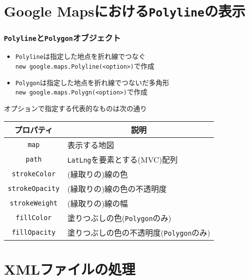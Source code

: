  \section{Google Mapsにおける\texttt{Polyline}の表示}
\begin{frame}[containsverbatim]
 \frametitle{\texttt{Polyline}と\texttt{Polygon}オブジェクト}
 \begin{itemize}
  \item \texttt{Polyline}は指定した地点を折れ線でつなぐ\\
        \texttt{new google.maps.Polyline(<option>)}で作成
  \item \texttt{Polygon}は指定した地点を折れ線でつないだ多角形\\
        \texttt{new google.maps.Polygn(<option>)}で作成
 \end{itemize}
 オプションで指定する代表的なものは次の通り
\begin{center}
 \begin{tabular}{|c|p{}|}\hline
  プロパティ& \multicolumn{1}{c|}{説明}\\\hline
  \texttt{map}& 表示する地図\\ \hline
  \texttt{path}& \texttt{LatLng}を要素とする(MVC)配列\\ \hline
  \texttt{strokeColor}& (縁取りの)線の色\\ \hline
  \texttt{strokeOpacity}& (縁取りの)線の色の不透明度\\ \hline
  \texttt{strokeWeight}& (縁取りの)線の幅\\ \hline
  \texttt{fillColor}& 塗りつぶしの色(\texttt{Polygon}のみ)\\ \hline
  \texttt{fillOpacity}& 塗りつぶしの色の不透明度(\texttt{Polygon}のみ)\\ \hline
 \end{tabular}
\end{center}
\end{frame}
\section{XMLファイルの処理}
